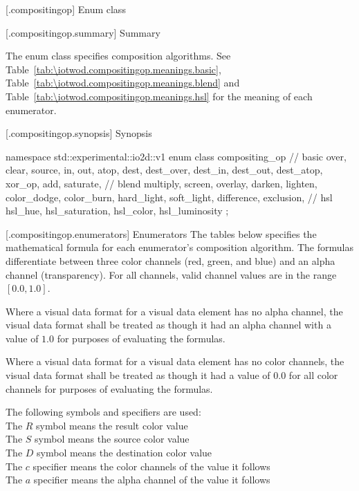 [\iotwod.compositingop] {Enum class }

 [\iotwod.compositingop.summary] { 
Summary}

\pnum
The  enum class specifies composition algorithms. See Table~\ref{tab:\iotwod.compositingop.meanings.basic}, 
Table~\ref{tab:\iotwod.compositingop.meanings.blend} and 
Table~\ref{tab:\iotwod.compositingop.meanings.hsl} for the meaning of 
each  enumerator.

 [\iotwod.compositingop.synopsis] { 
Synopsis}

\begin{codeblock}
namespace std::experimental::io2d::v1 {
  enum class compositing_op {
    // basic
    over,
    clear,
    source,
    in,
    out,
    atop,
    dest,
    dest_over,
    dest_in,
    dest_out,
    dest_atop,
    xor_op,
    add,
    saturate,
    // blend
    multiply,
    screen,
    overlay,
    darken,
    lighten,
    color_dodge,
    color_burn,
    hard_light,
    soft_light,
    difference,
    exclusion,
    // hsl
    hsl_hue,
    hsl_saturation,
    hsl_color,
    hsl_luminosity
  };
}
\end{codeblock}

 [\iotwod.compositingop.enumerators] { 
Enumerators}
\pnum
The tables below specifies the mathematical formula for each enumerator's composition algorithm. The formulas differentiate between three color channels (red, green, and blue) and an alpha channel (transparency). For all channels, valid channel values are in the range $[0.0, 1.0]$.

\pnum
Where a visual data format for a visual data element has no alpha channel, the visual data format shall be treated as though it had an alpha channel with a value of $1.0$ for purposes of evaluating the formulas.

\pnum
Where a visual data format for a visual data element has no color channels, the visual data format shall be treated as though it had a value of $0.0$ for all color channels for purposes of evaluating the formulas.

\pnum
The following symbols and specifiers are used:\\
\hspace*{1em}The $R$ symbol means the result color value\\
\hspace*{1em}The $S$ symbol means the source color value\\
\hspace*{1em}The $D$ symbol means the destination color value\\
\hspace*{1em}The $c$ specifier means the color channels of the value it 
follows\\
\hspace*{1em}The $a$ specifier means the alpha channel of the value it follows

